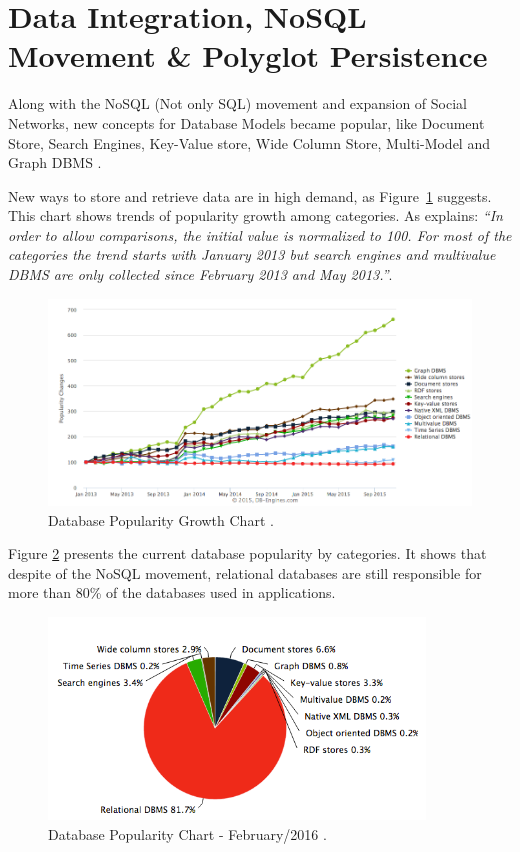 \section{Data Integration, NoSQL Movement \& Polyglot Persistence}

Along with the NoSQL (Not only SQL) movement and expansion of Social Networks, new concepts for Database Models became popular, like Document Store, Search Engines, Key-Value store, Wide Column Store, Multi-Model and Graph DBMS \cite{dbrankingchart}. 

New ways to store and retrieve data are in high demand, as Figure~\ref{fig:popularityDB} suggests. This chart shows trends of popularity growth among categories. As \cite{dbrankingchart} explains: \textit{``In order to allow comparisons, the initial value is normalized to 100. For most of the categories the trend starts with January 2013 but search engines and multivalue DBMS are only collected since February 2013 and May 2013.''}. 



\begin{figure}[ht!]
\centering
\includegraphics[width=150mm]{popularityDB.png}
\caption{Database Popularity Growth Chart \cite{dbrankingchart}.\label{fig:popularityDB}}
\end{figure}

Figure \ref{fig:currentPopularity} presents the current database popularity by categories. It shows that despite of the NoSQL movement, relational databases are still responsible for more than 80\% of the databases used in applications.

\begin{figure}[ht!]
\centering
\includegraphics[width=100mm]{Imagens/DBpie.png}
\caption{Database Popularity Chart - February/2016 \cite{dbrankingchart}.\label{fig:currentPopularity}}
\end{figure}


